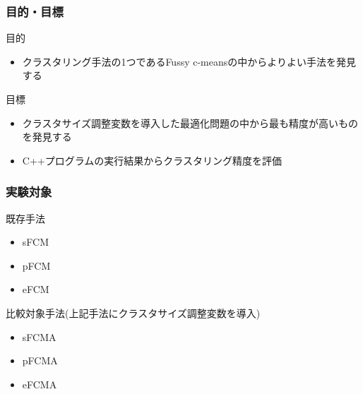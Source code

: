 \documentclass[13pt,dvipdfmx]{beamer}
\begin{document}
\begin{frame}\frametitle{目的・目標}
\begin{block}{目的}
\begin{itemize}
\item クラスタリング手法の1つであるFussy c-meansの中からよりよい手法を発見する
\end{itemize}
\end{block}
\vspace{4mm}
\begin{block}{目標}
  \begin{itemize}
  \item クラスタサイズ調整変数を導入した最適化問題の中から最も精度が高いものを発見する
  \item C++プログラムの実行結果からクラスタリング精度を評価
\end{itemize}
\end{block}
\end{frame}

\begin{frame}\frametitle{実験対象}
  \begin{block}{既存手法}
   \begin{itemize}
    \item sFCM
    \item pFCM
    \item eFCM
   \end{itemize}
  \end{block}
 \begin{block}{比較対象手法(上記手法にクラスタサイズ調整変数を導入)}
   \begin{itemize}
    \item sFCMA
    \item pFCMA
    \item eFCMA
   \end{itemize}
 \end{block}
\end{frame}
\end{document}
